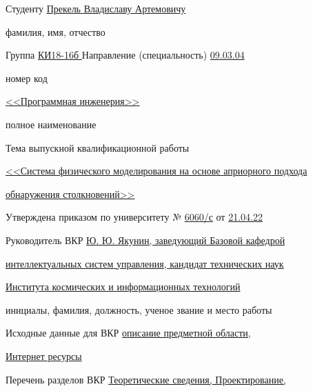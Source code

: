 \begin{spacing}{1}{
        \setlength{\parindent}{0cm}

        Студенту \uline{\hfill Прекель Владиславу Артемовичу \hfill}

        \vspace{-4pt}
        {\footnotesize\hfill фамилия, имя, отчество \hfill}

        Группа \uline{\hfill КИ18-16б \hfill} Направление (специальность) \uline{\hfill\hfill 09.03.04 \hfill\hfill}

        \vspace{-4pt}
        {\footnotesize {\normalsize\hspace{8ex}} \hfill номер \hfill {\normalsize\hspace{32ex}} \hfill\hfill код \hfill\hfill}

        \uline{\hfill <<Программная инженерия>> \hfill}

        \vspace{-4pt}
        {\footnotesize  \hfill полное наименование \hfill}

        Тема выпускной квалификационной работы \uline{\hfill}

        \uline{\hfill<<Система физического моделирования на основе априорного подхода\hfill}

        \uline{\hfill обнаружения столкновений>>\hfill}

        Утверждена приказом по университету № \uline{\hfill6060/с\hfill} от \uline{\hfill\hfill\hfill21.04.22\hfill\hfill\hfill}

        Руководитель ВКР \uline{\hfill Ю. Ю. Якунин, заведующий Базовой кафедрой \hfill}

        \uline{\hfill интеллектуальных систем управления, кандидат технических наук \hfill}

        \uline{\hfill Института космических и информационных технологий \hfill}

        \vspace{-4pt}
        {\footnotesize \hfill инициалы, фамилия, должность, ученое звание и место работы \hfill}

        Исходные данные для ВКР \uline{описание предметной области,\hfill}

        \uline{Интернет ресурсы\hfill}

        \uline{\hfill}

        Перечень разделов ВКР \uline{Теоретические сведения, Проектирование, \hfill}

}
\end{spacing}
